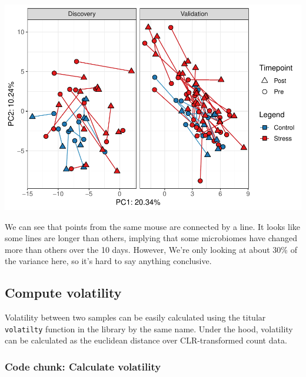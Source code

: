 \documentclass[
]{article}
\newenvironment{Shaded}{\begin{snugshade}}{\end{snugshade}}
\newcommand{\AttributeTok}[1]{\textcolor[rgb]{0.77,0.63,0.00}{#1}}
\newcommand{\FunctionTok}[1]{\textcolor[rgb]{0.00,0.00,0.00}{#1}}
\newcommand{\NormalTok}[1]{#1}
\newcommand{\OtherTok}[1]{\textcolor[rgb]{0.56,0.35,0.01}{#1}}
\newcommand{\SpecialCharTok}[1]{\textcolor[rgb]{0.00,0.00,0.00}{#1}}
\begin{document}
\includegraphics{README_part2_files/figure-latex/unnamed-chunk-12-1.pdf}

We can see that points from the same mouse are connected by a line. It
looks like some lines are longer than others, implying that some
microbiomes have changed more than others over the 10 days. However,
We're only looking at about 30\% of the variance here, so it's hard to
say anything conclusive.

\hypertarget{compute-volatility}{%
\subsection{Compute volatility}\label{compute-volatility}}

Volatility between two samples can be easily calculated using the
titular \texttt{volatilty} function in the library by the same name.
Under the hood, volatility can be calculated as the euclidean distance
over CLR-transformed count data.

\hypertarget{code-chunk-calculate-volatility}{%
\subsubsection{Code chunk: Calculate
volatility}\label{code-chunk-calculate-volatility}}

\begin{Shaded}
\end{Shaded}
\end{document}
